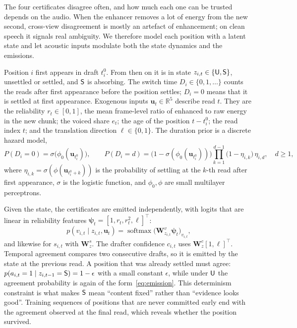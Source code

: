 The four certificates disagree often, and how much each one can be trusted depends on the audio.
When the enhancer removes a lot of energy from the new second, cross-view disagreement is mostly an artefact of enhancement; on clean speech it signals real ambiguity.
We therefore model each position with a latent state and let acoustic inputs modulate both the state dynamics and the emissions.

Position $i$ first appears in draft $t^0_i$.
From then on it is in state $z_{i,t} \in \{\mathsf{U}, \mathsf{S}\}$, unsettled or settled, and $\mathsf{S}$ is absorbing.
The switch time $D_i \in \{0,1,\dots\}$ counts the reads after first appearance before the position settles; $D_i = 0$ means that it is settled at first appearance.
Exogenous inputs $\bm{u}_t \in \mathbb{R}^{5}$ describe read $t$.
They are the reliability $r_t \in [0,1]$, the mean frame-level ratio of enhanced to raw energy in the new chunk; the voiced share $e_t$; the age of the position $t - t^0_i$; the read index $t$; and the translation direction $\ell \in \{0,1\}$.
The duration prior is a discrete hazard model,
\begin{equation}
P(D_i = 0) = \sigma\big(\phi_0(\bm{u}_{t^0_i})\big), \qquad
P(D_i = d) = \big(1 - \sigma(\phi_0(\bm{u}_{t^0_i}))\big) \prod_{k=1}^{d-1}\big(1 - \eta_{i,k}\big)\, \eta_{i,d}, \quad d \ge 1,
\label{eq:hazard}
\end{equation}
where $\eta_{i,k} = \sigma(\phi(\bm{u}_{t^0_i + k}))$ is the probability of settling at the $k$-th read after first appearance, $\sigma$ is the logistic function, and $\phi_0, \phi$ are small multilayer perceptrons.

Given the state, the certificates are emitted independently, with logits that are linear in reliability features $\bm{\psi}_t = [1, r_t, r_t^2, \ell]^\top$:
\begin{equation}
p(v_{i,t} \mid z_{i,t}, \bm{u}_t) = \operatorname{softmax}\big(\mathbf{W}^{v}_{z_{i,t}} \bm{\psi}_t\big)_{v_{i,t}},
\label{eq:emission}
\end{equation}
and likewise for $s_{i,t}$ with $\mathbf{W}^{s}_{z}$.
The drafter confidence $c_{i,t}$ uses $\mathbf{W}^{c}_{z}[1,\ell]^\top$.
Temporal agreement compares two consecutive drafts, so it is emitted by the state at the previous read.
A position that was already settled must agree: $p(a_{i,t} = 1 \mid z_{i,t-1} = \mathsf{S}) = 1 - \epsilon$ with a small constant $\epsilon$, while under $\mathsf{U}$ the agreement probability is again of the form~\eqref{eq:emission}.
This determinism constraint is what makes $\mathsf{S}$ mean ``content fixed'' rather than ``evidence looks good''.
Training sequences of positions that are never committed early end with the agreement observed at the final read, which reveals whether the position survived.


